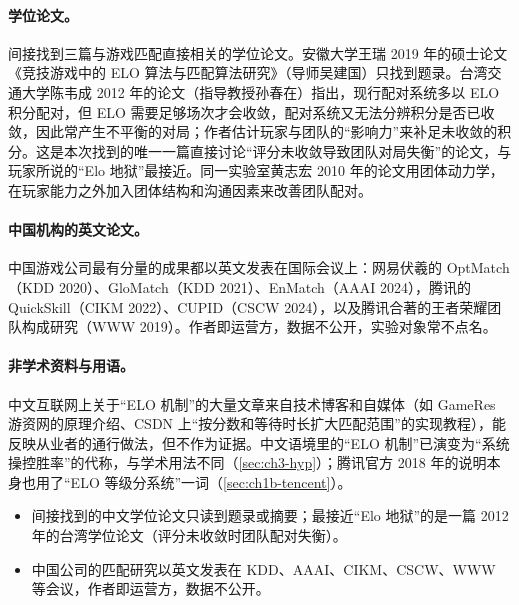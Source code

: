 \paragraph{学位论文。}间接找到三篇与游戏匹配直接相关的学位论文。安徽大学王瑞 2019 年的硕士论文《竞技游戏中的 ELO 算法与匹配算法研究》（导师吴建国）只找到题录\cite{wang2019jingji}\tagLit\needcheck[；仅见第三方题录]。台湾交通大学陈韦成 2012 年的论文（指导教授孙春在）指出，现行配对系统多以 ELO 积分配对，但 ELO 需要足够场次才会收敛，配对系统又无法分辨积分是否已收敛，因此常产生不平衡的对局；作者估计玩家与团队的“影响力”来补足未收敛的积分\cite{chen2012pinggu}\tagLit\needcheck[；仅读到检索摘要]。这是本次找到的唯一一篇直接讨论“评分未收敛导致团队对局失衡”的论文，与玩家所说的“Elo 地狱”最接近。同一实验室黄志宏 2010 年的论文用团体动力学，在玩家能力之外加入团体结构和沟通因素来改善团队配对\cite{huang2010tuanti}\tagLit\needcheck[；仅读到检索摘要]。

\paragraph{中国机构的英文论文。}中国游戏公司最有分量的成果都以英文发表在国际会议上：网易伏羲的 OptMatch（KDD 2020）、GloMatch（KDD 2021）、EnMatch（AAAI 2024），腾讯的 QuickSkill（CIKM 2022）、CUPID（CSCW 2024），以及腾讯合著的王者荣耀团队构成研究（WWW 2019）\cite{gong2020optmatch,deng2021globally,wang2024enmatch,zhang2022quickskill,fan2024cupid,cheng2019makes}\tagLit。作者即运营方，数据不公开，实验对象常不点名。

\paragraph{非学术资料与用语。}中文互联网上关于“ELO 机制”的大量文章来自技术博客和自媒体（如 GameRes 游资网的原理介绍、CSDN 上“按分数和等待时长扩大匹配范围”的实现教程），能反映从业者的通行做法，但不作为证据。中文语境里的“ELO 机制”已演变为“系统操控胜率”的代称，与学术用法不同（\cref{sec:ch3-hyp}）；腾讯官方 2018 年的说明本身也用了“ELO 等级分系统”一词（\cref{sec:ch1b-tencent}）。

\begin{keybox}
\begin{itemize}
  \item 间接找到的中文学位论文只读到题录或摘要；最接近“Elo 地狱”的是一篇 2012 年的台湾学位论文（评分未收敛时团队配对失衡）。
  \item 中国公司的匹配研究以英文发表在 KDD、AAAI、CIKM、CSCW、WWW 等会议，作者即运营方，数据不公开。
\end{itemize}
\end{keybox}


